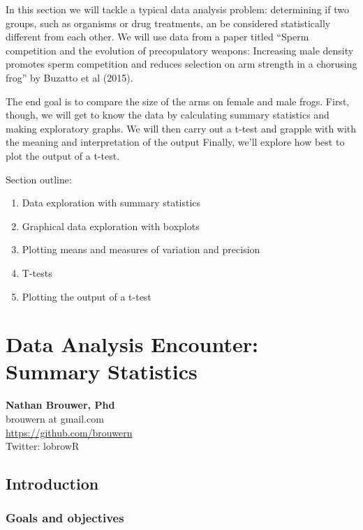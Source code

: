\documentclass[]{book}
\providecommand{\tightlist}{%
  \setlength{\itemsep}{0pt}\setlength{\parskip}{0pt}}
\theoremstyle{definition}
\theoremstyle{definition}
\theoremstyle{definition}
\theoremstyle{remark}
\begin{document}
In this section we will tackle a typical data analysis problem:
determining if two groups, such as organisms or drug treatments, an be
considered statistically different from each other. We will use data
from a paper titled ``Sperm competition and the evolution of
precopulatory weapons: Increasing male density promotes sperm
competition and reduces selection on arm strength in a chorusing frog''
by Buzatto et al (2015).

The end goal is to compare the size of the arms on female and male
frogs. First, though, we will get to know the data by calculating
summary statistics and making exploratory graphs. We will then carry out
a t-test and grapple with with the meaning and interpretation of the
output Finally, we'll explore how best to plot the output of a t-test.

Section outline:

\begin{enumerate}
\def\labelenumi{\arabic{enumi}.}
\tightlist
\item
  Data exploration with summary statistics
\item
  Graphical data exploration with boxplots
\item
  Plotting means and measures of variation and precision
\item
  T-tests
\item
  Plotting the output of a t-test
\end{enumerate}

\chapter{Data Analysis Encounter: Summary
Statistics}\label{data-analysis-encounter-summary-statistics}

\textbf{Nathan Brouwer, Phd}\\
brouwern at gmail.com\\
\url{https://github.com/brouwern}\\
Twitter: lobrowR

\section{Introduction}\label{introduction-8}

\subsection{Goals and objectives}\label{goals-and-objectives}
\end{document}
